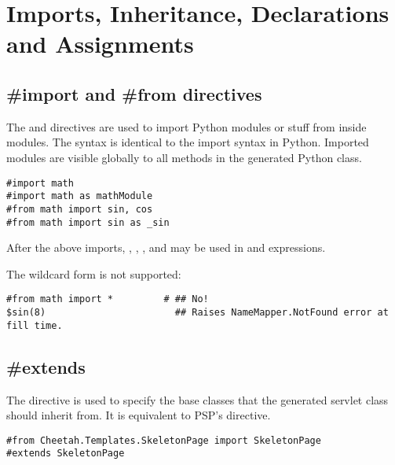 \section{Imports, Inheritance, Declarations and Assignments}
\label{inheritanceEtc}


\subsection{\#import and \#from directives}
\label{inheritanceEtc.import}

The  and  directives are used to import Python
modules or stuff from inside modules.  The syntax is identical to the import
syntax in Python.  Imported modules are visible globally to all methods in the
generated Python class.

\begin{verbatim}
#import math
#import math as mathModule
#from math import sin, cos
#from math import sin as _sin
\end{verbatim}

After the above imports, , , 
,  and  may be used in 
 and expressions.

The wildcard form  is not supported:
\begin{verbatim}
#from math import *         # ## No!  
$sin(8)                       ## Raises NameMapper.NotFound error at fill time.
\end{verbatim}

\subsection{\#extends}
\label{inheritanceEtc.extends}

The  directive is used to specify the base classes that the
generated servlet class should inherit from.  It is equivalent to PSP's
 directive.

\begin{verbatim}
#from Cheetah.Templates.SkeletonPage import SkeletonPage
#extends SkeletonPage
\end{verbatim}

